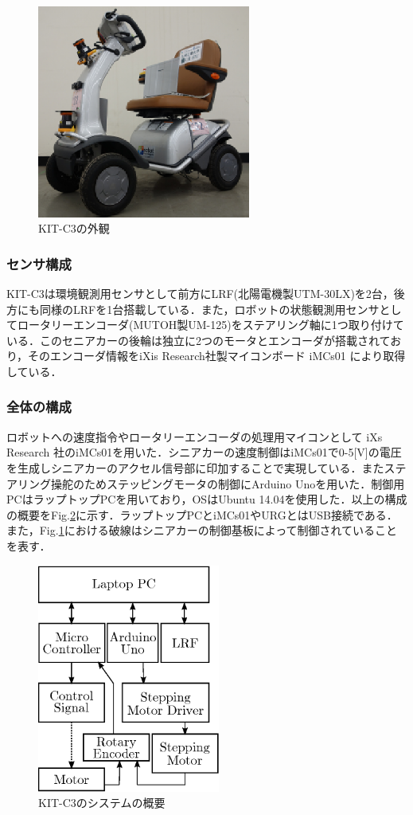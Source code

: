 \documentclass[10pt,a4paper]{jarticle}
\begin{document}
\begin{figure}
  \centering
  \includegraphics[width=7cm]{fig/eps/kitc3.eps}
  \caption{KIT-C3の外観}
  \label{213021_18Dec14}
\end{figure}

\subsubsection{センサ構成}
KIT-C3は環境観測用センサとして前方にLRF(北陽電機製UTM-30LX)を2台，後方にも同様のLRFを1台搭載している．また，ロボットの状態観測用センサとしてロータリーエンコーダ(MUTOH製UM-125)をステアリング軸に1つ取り付けている．このセニアカーの後輪は独立に2つのモータとエンコーダが搭載されており，そのエンコーダ情報をiXis Research社製マイコンボード iMCs01 により取得している．

\subsubsection{全体の構成}
ロボットへの速度指令やロータリーエンコーダの処理用マイコンとして iXs Research 社のiMCs01を用いた．シニアカーの速度制御はiMCs01で0-5[V]の電圧を生成しシニアカーのアクセル信号部に印加することで実現している．またステアリング操舵のためステッピングモータの制御にArduino Unoを用いた．制御用PCはラップトップPCを用いており，OSはUbuntu 14.04を使用した．以上の構成の概要をFig.\ref{225251_18Dec14}に示す．ラップトップPCとiMCs01やURGとはUSB接続である．また，Fig.\ref{213021_18Dec14}における破線はシニアカーの制御基板によって制御されていることを表す．

\begin{figure}[tbp]
  \centering
  \includegraphics[width=6cm]{fig/eps/kitc3_overview.eps}
  \caption{KIT-C3のシステムの概要}
  \label{225251_18Dec14}
\end{figure}
\end{document}

